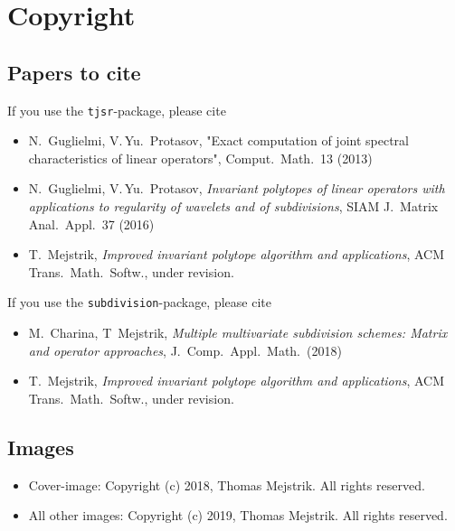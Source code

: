 

\chapter{Copyright}

\section{Papers to cite}
If you use the \texttt{tjsr}-package, please cite
\begin{itemize}
    \item 
    N.~Guglielmi, V.\,Yu.~Protasov, "Exact computation of joint spectral characteristics of linear operators", Comput.\ Math.\ 13 (2013)
    
    \item
    N.~Guglielmi, V.\,Yu.~Protasov, 
    \emph{Invariant polytopes of linear operators with applications to regularity of wavelets and of subdivisions},
    SIAM J.\ Matrix Anal.\ Appl.\ 37 (2016)
    
    \item
    T.~Mejstrik, 
    \emph{Improved invariant polytope algorithm and applications}, 
    ACM Trans.\ Math.\ Softw., under revision.
\end{itemize}

If you use the \texttt{subdivision}-package, please cite
\begin{itemize}
    \item
    M.~Charina, T~Mejstrik, 
    \emph{Multiple multivariate subdivision schemes: Matrix and operator approaches},
    J.\ Comp.\ Appl.\ Math.\ (2018)
    
    \item
    T.~Mejstrik, 
    \emph{Improved invariant polytope algorithm and applications}, 
    ACM Trans.\ Math.\ Softw., under revision.
\end{itemize}


\section{Images}\label{licence_coverimage}
\begin{itemize}
    \item Cover-image: Copyright (c) 2018, Thomas Mejstrik. All rights reserved.
    \item All other images: Copyright (c) 2019, Thomas Mejstrik. All rights reserved.
\end{itemize}

